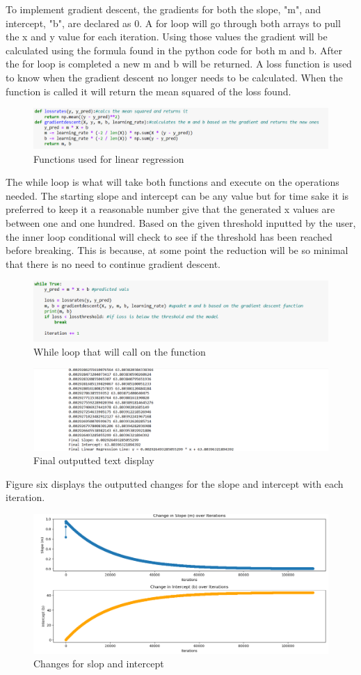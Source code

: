 \documentclass{article}
\begin{document}
To implement gradient descent, the gradients for both the slope, "m", and intercept, "b", are declared as 0. A for loop will go through both arrays to pull the x and y value for each iteration. Using those values the gradient will be calculated using the formula found in the python code for both m and b. After the for loop is completed a new m and b will be returned. A loss function is used to know when the gradient descent no longer needs to be calculated. When the function is called it will return the mean squared of the loss found. 
\begin{figure}
    \centering
    \includegraphics[width=0.5\linewidth]{asdasdasdwqa.png}
    \caption{Functions used for linear regression}
    \label{fig:enter-label}
\end{figure}
The while loop is what will take both functions and execute on the operations needed. The starting slope and intercept can be any value but for time sake it is preferred to keep it a reasonable number give that the generated x values are between one and one hundred. Based on the given threshold inputted by the user, the inner loop conditional will check to see if the threshold has been reached before breaking. This is because, at some point the reduction will be so minimal that there is no need to continue gradient descent.
\begin{figure}
    \centering
    \includegraphics[width=0.5\linewidth]{asfwgsdgewrenrherher.png}
    \caption{While loop that will call on the function}
    \label{fig:enter-label}
\end{figure}
\begin{figure}
    \centering
    \includegraphics[width=0.5\linewidth]{aasdirututhgg.png}
    \caption{Final outputted text display}
    \label{fig:enter-label}
\end{figure}
Figure six displays the outputted changes for the slope and intercept with each iteration.
\begin{figure}
    \centering
    \includegraphics[width=0.5\linewidth]{changeplot.png}
    \caption{Changes for slop and intercept}
    \label{fig:enter-label}
\end{figure}
\end{document}

